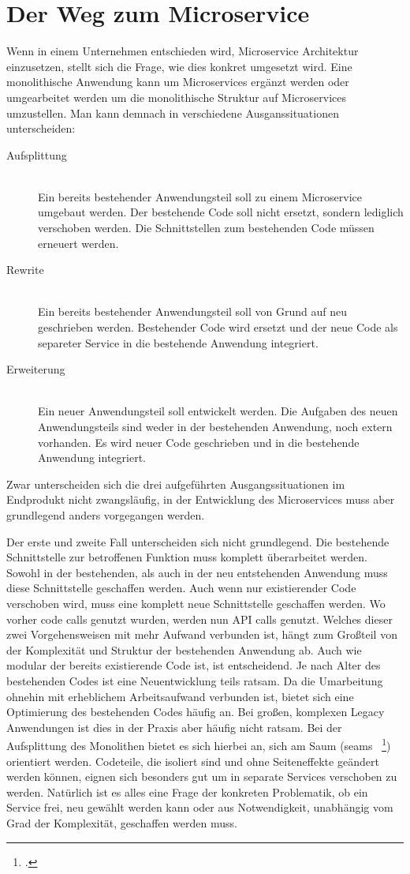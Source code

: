 \section{Der Weg zum Microservice}
Wenn in einem Unternehmen entschieden wird, Microservice Architektur einzusetzen, stellt sich die Frage, wie dies konkret umgesetzt wird. Eine monolithische Anwendung kann um Microservices ergänzt werden oder umgearbeitet werden um die monolithische Struktur auf Microservices umzustellen.
Man kann demnach in verschiedene Ausganssituationen unterscheiden:
\begin{description}
  \item[Aufsplittung] \hfill \\
  Ein bereits bestehender Anwendungsteil soll zu einem Microservice umgebaut werden. Der bestehende Code soll nicht ersetzt, sondern lediglich verschoben werden. Die Schnittstellen zum bestehenden Code müssen erneuert werden.
  \item[Rewrite] \hfill \\
  Ein bereits bestehender Anwendungsteil soll von Grund auf neu geschrieben werden. Bestehender Code wird ersetzt und der neue Code als separeter Service in die bestehende Anwendung integriert.
  \item[Erweiterung] \hfill \\
  Ein neuer Anwendungsteil soll entwickelt werden. Die Aufgaben des neuen Anwendungsteils sind weder in der bestehenden Anwendung, noch extern vorhanden. Es wird neuer Code geschrieben und in die bestehende Anwendung integriert.
\end{description}
Zwar unterscheiden sich die drei aufgeführten Ausgangssituationen im Endprodukt nicht zwangsläufig, in der Entwicklung des Microservices muss aber grundlegend anders vorgegangen werden. 

Der erste und zweite Fall unterscheiden sich nicht grundlegend. Die bestehende Schnittstelle zur betroffenen Funktion muss komplett überarbeitet werden. Sowohl in der bestehenden, als auch in der neu entstehenden Anwendung muss diese Schnittstelle geschaffen werden. Auch wenn nur existierender Code verschoben wird, muss eine komplett neue Schnittstelle geschaffen werden. Wo vorher code calls genutzt wurden, werden nun API calls genutzt.
Welches dieser zwei Vorgehensweisen mit mehr Aufwand verbunden ist, hängt zum Großteil von der Komplexität und Struktur der bestehenden Anwendung ab. Auch wie modular der bereits existierende Code ist, ist entscheidend. Je nach Alter des bestehenden Codes ist eine Neuentwicklung teils ratsam. Da die Umarbeitung ohnehin mit erheblichem Arbeitsaufwand verbunden ist, bietet sich eine Optimierung des bestehenden Codes häufig an. Bei großen, komplexen Legacy Anwendungen ist dies in der Praxis aber häufig nicht ratsam.
Bei der Aufsplittung des Monolithen bietet es sich hierbei an, sich am Saum (seams ~\footcite[vgl.][Seite 29 ff.]{feathers2004working}) orientiert werden. Codeteile, die isoliert sind und ohne Seiteneffekte geändert werden können, eignen sich besonders gut um in separate Services verschoben zu werden. Natürlich ist es alles eine Frage der konkreten Problematik, ob ein Service frei, neu gewählt werden kann oder aus Notwendigkeit, unabhängig vom Grad der Komplexität, geschaffen werden muss.

